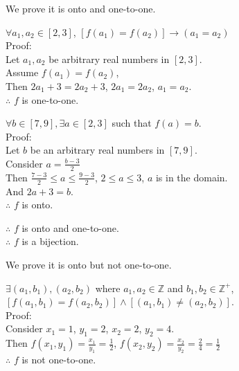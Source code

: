 \documentclass[12pt]{exam}
\begin{document}
\begin{solution}
    \begin{qparts}
        \item 
        We prove it is onto and one-to-one.
        \begin{subparts}
            \item $\forall a_1, a_2 \in [2,3]$, $[f(a_1) = f(a_2)] \rightarrow (a_1 = a_2)$\\
            Proof:
            \\Let $a_1, a_2$ be arbitrary real numbers in $[2,3]$.\\
            Assume $f(a_1) = f(a_2)$,\\
            Then $2a_1 + 3 = 2a_2 + 3$, $2a_1 = 2a_2$, $a_1 = a_2$.\\
            $\therefore$ $f$ is one-to-one.
            \item $\forall b \in [7,9], \exists a \in [2,3]$ such that $f(a) = b$.\\
            Proof:
            \\Let $b$ be an arbitrary real numbers in $[7,9]$.\\
            Consider $a = \frac{b-3}{2}$\\
            Then $\frac{7-3}{2} \leq a \leq \frac{9-3}{2}$, $2 \leq a \leq 3$, $a$ is in the domain.\\
            And $2a + 3 = b$.\\
            $\therefore$ $f$ is onto.
        \end{subparts}
        $\therefore$ $f$ is onto and one-to-one.\\
        $\therefore$ $f$ is a bijection.
        \item 
        We prove it is onto but not one-to-one.
        \begin{subparts}
            \item 
            $\exists (a_1, b_1), (a_2, b_2)$ where $a_1, a_2 \in \mathbb{Z}$ 
            and $b_1, b_2\in\mathbb{Z^+}$, $[f(a_1, b_1) = f(a_2, b_2)] \land [(a_1,b_1) \not = (a_2, b_2)]$.\\
            Proof:\\
            Consider $x_1 = 1$, $y_1 = 2$, $x_2 = 2$, $y_2 = 4$.\\
            Then $f(x_1,y_1) = \frac{x_1}{y_1} = \frac{1}{2}$, $f(x_2,y_2) = \frac{x_2}{y_2} = \frac{2}{4} = \frac{1}{2}$\\
            $\therefore$ $f$ is not one-to-one.
            \item 

\end{subparts}
\end{qparts}
\end{solution}
\end{document}
